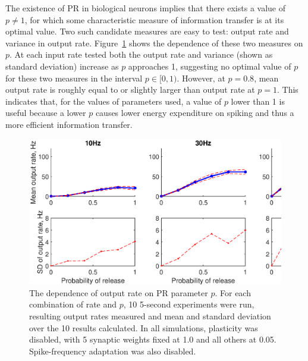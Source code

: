 \documentclass[a4paper,12pt]{report}
\theoremstyle{definition}
\begin{document}

The existence of PR in biological neurons implies that there exists a value of $p \neq 1$, for which some characteristic measure of information transfer is at its optimal value. Two such candidate measures are easy to test: output rate and variance in output rate. Figure~\ref{fig:exp7grid} shows the dependence of these two measures on $p$. At each input rate tested both the output rate and variance (shown as standard deviation) increase as $p$ approaches 1, suggesting no optimal value of $p$ for these two measures in the interval $p \in [0,1)$. However, at $p=0.8$, mean output rate is roughly equal to or slightly larger than output rate at $p=1$. This indicates that, for the values of parameters used, a value of $p$ lower than 1 is useful because a lower $p$ causes lower energy expenditure on spiking and thus a more efficient information transfer.

\begin{figure}[!htb]
    \includegraphics[width=\textwidth]{figures/exp7_PRoutputvariance_grid.eps}
    \caption{The dependence of output rate on PR parameter $p$. For each combination of rate and $p$, 10 5-second experiments were run, resulting output rates measured and mean and standard deviation over the 10 results calculated. In all simulations, plasticity was disabled, with 5 synaptic weights fixed at 1.0 and all others at 0.05. Spike-frequency adaptation was also disabled.}
    \label{fig:exp7grid}
\end{figure}
\end{document}
